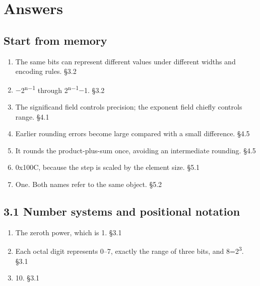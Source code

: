 \documentclass[11pt]{article}
\begin{document}
\section{Answers}
\begin{keepsection}\subsection{Start from memory}

\begin{enumerate}
\item The same bits can represent different values under different widths and encoding rules. \hfill{\small\color{FAUblue}§3.2}
\item \ensuremath{-}2\textsuperscript{n\ensuremath{-}1} through 2\textsuperscript{n\ensuremath{-}1}\ensuremath{-}1. \hfill{\small\color{FAUblue}§3.2}
\item The significand field controls precision; the exponent field chiefly controls range. \hfill{\small\color{FAUblue}§4.1}
\item Earlier rounding errors become large compared with a small difference. \hfill{\small\color{FAUblue}§4.5}
\item It rounds the product-plus-sum once, avoiding an intermediate rounding. \hfill{\small\color{FAUblue}§4.5}
\item 0x100C, because the step is scaled by the element size. \hfill{\small\color{FAUblue}§5.1}
\item One. Both names refer to the same object. \hfill{\small\color{FAUblue}§5.2}
\end{enumerate}

\end{keepsection}
\begin{keepsection}\subsection{3.1 Number systems and positional notation}

\begin{enumerate}
\item The zeroth power, which is 1. \hfill{\small\color{FAUblue}§3.1}
\item Each octal digit represents 0–7, exactly the range of three bits, and 8=2\textsuperscript{3}. \hfill{\small\color{FAUblue}§3.1}
\item 10. \hfill{\small\color{FAUblue}§3.1}
\end{enumerate}

\end{keepsection}
\end{document}
